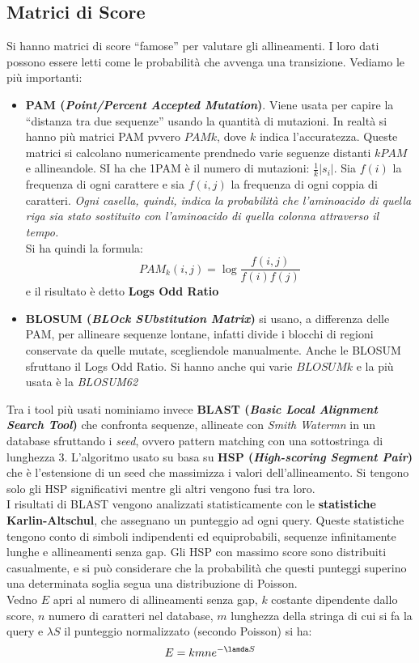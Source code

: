 \documentclass[a4paper,12pt, oneside]{book}
\begin{document}
\subsection{Matrici di Score}
Si hanno matrici di score ``famose'' per valutare gli allineamenti. I
loro dati possono essere letti come le probabilità che avvenga una
transizione. Vediamo le più importanti:
\begin{itemize}
  \item \textbf{PAM (\textit{Point/Percent Accepted Mutation})}. Viene
  usata per capire la ``distanza tra due sequenze'' usando la
  quantità di mutazioni. In realtà si hanno più matrici PAM pvvero
  $PAMk$, dove $k$ indica l'accuratezza. Queste matrici si calcolano
  numericamente prendnedo varie seguenze distanti $kPAM$ e
  allineandole. SI ha che 1PAM è il numero di mutazioni:
  $\frac{1}{k}|s_i|$. Sia $f(i)$ la frequenza di ogni carattere e sia
  $f(i,j)$ la frequenza di ogni coppia di caratteri. \textit{Ogni
    casella, quindi, indica la probabilità che l’aminoacido di quella
    riga sia stato sostituito con l’aminoacido di quella colonna
    attraverso il tempo.}\\
  Si ha quindi la formula:
  \[PAM_k(i,j)=\log\frac{f(i,j)}{f(i)f(j)}\]
  e il risultato è detto \textbf{Logs Odd Ratio}
  \item \textbf{BLOSUM (\textit{BLOck SUbstitution Matrix})} si usano,
  a differenza delle PAM, per allineare sequenze lontane, infatti
  divide i blocchi di regioni conservate da quelle mutate,
  scegliendole manualmente. Anche le BLOSUM sfruttano il Logs Odd
  Ratio. Si hanno anche qui varie $BLOSUMk$ e la
  più usata è la \textit{BLOSUM62}
\end{itemize}
Tra i tool più usati nominiamo invece \textbf{BLAST (\textit{Basic
    Local Alignment Search Tool})} che confronta sequenze, allineate
con \textit{Smith Watermn} in un database sfruttando i \textit{seed},
ovvero pattern matching con una sottostringa di lunghezza
3. L'algoritmo usato su basa su \textbf{HSP   (\textit{High-scoring
    Segment Pair})} che è l'estensione di un seed che massimizza i
valori dell'allineamento. Si tengono solo gli HSP significativi mentre
gli altri vengono fusi tra loro.\\
I risultati di BLAST vengono analizzati statisticamente con le
\textbf{statistiche Karlin-Altschul}, che assegnano un punteggio ad
ogni query. Queste statistiche tengono conto di simboli indipendenti
ed equiprobabili, sequenze infinitamente lunghe e allineamenti senza gap.
Gli HSP con massimo score sono distribuiti casualmente, e si può
considerare che la probabilità che questi punteggi superino una
determinata soglia segua una distribuzione di Poisson.\\
Vedno $E$ apri al numero di allineamenti senza gap, $k$ costante
dipendente dallo score, $n$ numero di caratteri nel database, $m$
lunghezza della stringa di cui si fa la query e $\lambda S$ il
punteggio normalizzato (secondo Poisson) si ha:
\[E=kmne^{-\lamda S}\]
\end{document}
